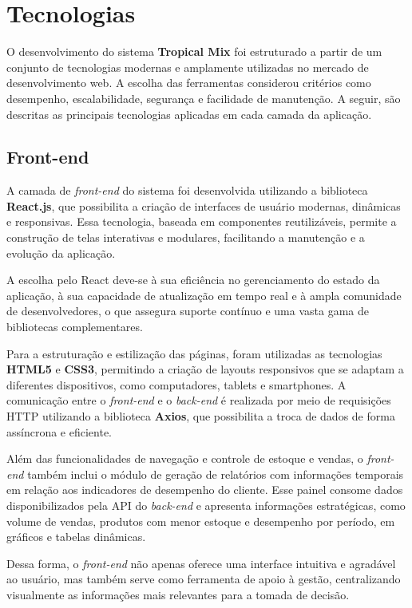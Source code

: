 \section{Tecnologias}

O desenvolvimento do sistema \textbf{Tropical Mix} foi estruturado a partir de um conjunto de tecnologias modernas e amplamente utilizadas no mercado de desenvolvimento web. A escolha das ferramentas considerou critérios como desempenho, escalabilidade, segurança e facilidade de manutenção. A seguir, são descritas as principais tecnologias aplicadas em cada camada da aplicação.

\subsection{Front-end}

A camada de \textit{front-end} do sistema foi desenvolvida utilizando a biblioteca \textbf{React.js}, que possibilita a criação de interfaces de usuário modernas, dinâmicas e responsivas. Essa tecnologia, baseada em componentes reutilizáveis, permite a construção de telas interativas e modulares, facilitando a manutenção e a evolução da aplicação.  

A escolha pelo React deve-se à sua eficiência no gerenciamento do estado da aplicação, à sua capacidade de atualização em tempo real e à ampla comunidade de desenvolvedores, o que assegura suporte contínuo e uma vasta gama de bibliotecas complementares.  

Para a estruturação e estilização das páginas, foram utilizadas as tecnologias \textbf{HTML5} e \textbf{CSS3}, permitindo a criação de layouts responsivos que se adaptam a diferentes dispositivos, como computadores, tablets e smartphones. A comunicação entre o \textit{front-end} e o \textit{back-end} é realizada por meio de requisições HTTP utilizando a biblioteca \textbf{Axios}, que possibilita a troca de dados de forma assíncrona e eficiente.  

Além das funcionalidades de navegação e controle de estoque e vendas, o \textit{front-end} também inclui o módulo de geração de relatórios com informações temporais em relação aos indicadores de desempenho do cliente. Esse painel consome dados disponibilizados pela API do \textit{back-end} e apresenta informações estratégicas, como volume de vendas, produtos com menor estoque e desempenho por período, em gráficos e tabelas dinâmicas.  

Dessa forma, o \textit{front-end} não apenas oferece uma interface intuitiva e agradável ao usuário, mas também serve como ferramenta de apoio à gestão, centralizando visualmente as informações mais relevantes para a tomada de decisão.

